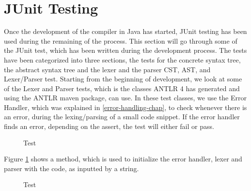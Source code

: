 \section{JUnit Testing}
Once the development of the compiler in Java has started, JUnit testing has been used during the remaining of the process. This section will go through some of the JUnit test, which has been written during the development process. The tests have been categorized into three sections, the tests for the concrete syntax tree, the abstract syntax tree and the lexer and the parser CST, AST, and Lexer/Parser test. 
Starting from the beginning of development, we look at some of the Lexer and Parser tests, which is the classes ANTLR 4 has generated and using the ANTLR maven package, can use. In these test classes, we use the Error Handler, which was explained in \ref{error-handling-chap}, to check whenever there is an error, during the lexing/parsing of a small code snippet. If the error handler finds an error, depending on the assert, the test will either fail or pass. 
\begin{figure}[H]
\centering
{}
\caption{Test}
\label{test1}
\end{figure}
Figure \ref{test1} shows a method, which is used to initialize the error handler, lexer and parser with the code, as inputted by a string. 
\begin{figure}[H]
\centering
{}
\caption{Test}
\label{test2}
\end{figure}
